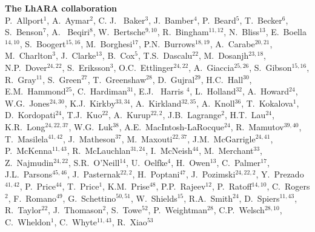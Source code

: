 \vspace{0.75cm}
\begin{center}
  {\bf \color{BlueViolet} The LhARA collaboration} \\
  \vspace{0.50cm}
  P.~Allport$^{1}$,
  A.~Aymar$^{2}$,
  C. J. ~Baker$^{3}$,
  J.~Bamber$^{4}$,
  P.~Beard$^{5}$,
  T.~Becker$^{6}$,
  S.~Benson$^{7}$,
  A. ~Beqiri$^{8}$,
  W.~Bertsche$^{9,10}$,
  R.~Bingham$^{11,12}$,
  N.~Bliss$^{13}$,
  E.~Boella$^{14,10}$,
  S.~Boogert$^{15,16}$,
  M.~Borghesi$^{17}$,
  P.N.~Burrows$^{18,19}$,
  A.~Carabe$^{20,21}$,
  M.~Charlton$^{3}$,
  J.~Clarke$^{13}$,
  B.~Cox$^{5}$,
  T.S.~Dascalu$^{22}$,
  M.~Dosanjh$^{23,18}$,
  N.P.~Dover$^{24,22}$,
  S.~Eriksson$^{3}$,
  O.C.~Ettlinger$^{24,22}$,
  A.~Giaccia$^{25,26}$,
  S.~Gibson$^{15,16}$,
  R.~Gray$^{11}$,
  S.~Green$^{27}$,
  T.~Greenshaw$^{28}$,
  D.~Gujral$^{29}$,
  H.C.~Hall$^{30}$,
  E.M.~Hammond$^{25}$,
  C.~Hardiman$^{31}$,
  E.J. ~Harris $^{4}$,
  L.~Holland$^{32}$,
  A.~Howard$^{24}$,
  W.G.~Jones$^{24,30}$,
  K.J.~Kirkby$^{33,34}$,
  A.~Kirkland$^{32,35}$,
  A.~Knoll$^{36}$,
  T.~Kokalova$^{1}$,
  D.~Kordopati$^{24}$,
  T.J.~Kuo$^{22}$,
  A.~Kurup$^{22,2}$,
  J.B.~Lagrange$^{2}$,
  H.T.~Lau$^{24}$,
  K.R.~Long$^{24,22,37}$,
  W.G.~Luk$^{38}$,
  A.E.~MacIntosh-LaRocque$^{24}$,
  R.~Mamutov$^{39,40}$,
  T.~Masilela$^{41,42}$,
  J.~Matheson$^{37}$,
  M.~Maxouti$^{22,37}$,
  J.M.~McGarrigle$^{24,41}$,
  P.~McKenna$^{11,43}$,
  R.~McLauchlan$^{31,24}$,
  I.~McNeish$^{44}$,
  M.~Merchant$^{33}$,
  Z.~Najmudin$^{24,22}$,
  S.R.~O'Neill$^{14}$,
  U.~Oelfke$^{4}$,
  H.~Owen$^{13}$,
  C.~Palmer$^{17}$,
  J.L.~Parsons$^{45,46}$,
  J.~Pasternak$^{22,2}$,
  H.~Poptani$^{47}$,
  J.~Pozimski$^{24,22,2}$,
  Y.~Prezado$^{41,42}$,
  P.~Price$^{44}$,
  T.~Price$^{1}$,
  K.M.~Prise$^{48}$,
  P.P.~Rajeev$^{12}$,
  P.~Ratoff$^{14,10}$,
  C.~Rogers$^{2}$,
  F.~Romano$^{49}$,
  G.~Schettino$^{50,51}$,
  W.~Shields$^{15}$,
  R.A.~Smith$^{24}$,
  D.~Spiers$^{11,43}$,
  R.~Taylor$^{22}$,
  J.~Thomason$^{2}$,
  S.~Towe$^{52}$,
  P.~Weightman$^{28}$,
  C.P.~Welsch$^{28,10}$,
  C.~Wheldon$^{1}$,
  C.~Whyte$^{11,43}$,
  R.~Xiao$^{53}$
\end{center}
\vspace{2.5cm}
